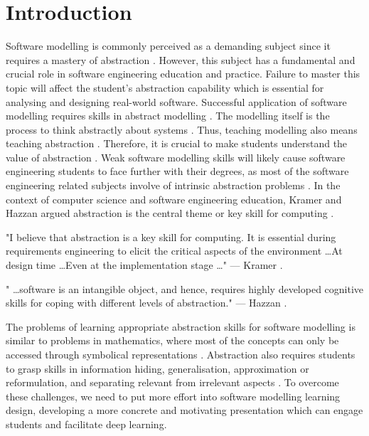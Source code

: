 \documentclass[12pt, a4paper]{report}
\begin{document}
\tableofcontents
{}

\chapter{Introduction}

Software modelling is commonly perceived as a demanding subject since it requires a mastery of abstraction \cite{Borstler2012}. However, this subject has a fundamental and crucial role in software engineering education and practice. Failure to master this topic will affect the student’s abstraction capability which is essential for analysing and designing real-world software. Successful application of software modelling requires skills in abstract modelling \cite{whittle2013industrial}. The modelling itself is the process to think abstractly about systems \cite{bezivin2009teaching}. Thus, teaching modelling also means teaching abstraction \cite{engels2005teaching}. Therefore, it is crucial to make students understand the value of abstraction \cite{bezivin2009teaching}. Weak software modelling skills will likely cause software engineering students to face further with their degrees, as most of the software engineering related subjects involve of intrinsic abstraction problems \cite{Kramer2007}. In the context of computer science and software engineering education, Kramer and Hazzan argued abstraction is the central theme or key skill for computing \cite{Kramer2007, hazzan2008reflections}.

\begin{displayquote}
"I believe that abstraction is a key skill for computing. It is essential during requirements engineering to elicit the critical aspects of the environment \dots At design time  \dots Even at the implementation stage \dots " --- Kramer \cite{Kramer2007}.
\end{displayquote}

\begin{displayquote}
" \dots software is an intangible object, and hence, requires highly developed cognitive skills for coping  with different levels of abstraction." --- Hazzan \cite{hazzan2008reflections}.
\end{displayquote}

The problems of learning appropriate abstraction skills for software modelling is similar to problems in mathematics, where most of the concepts can only be accessed through symbolical representations \cite{Duval2006}. Abstraction also requires students to grasp skills in information hiding, generalisation, approximation or reformulation, and separating relevant from irrelevant aspects \cite{Saitta2013}. To overcome these challenges, we need to put more effort into software modelling learning design, developing a more concrete and motivating presentation which can engage students and facilitate deep learning.
\end{document}
